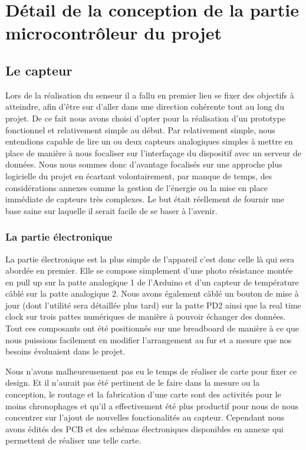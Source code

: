 \section{Détail de la conception de la partie microcontrôleur du projet}
	\subsection{Le capteur}
		Lors de la réalisation du senseur il a fallu en premier lieu se fixer
		des objectifs à atteindre, afin d'être sur d'aller dans une direction
		cohérente tout au long du projet. De  ce fait nous avons choisi d'opter pour
		la réalisation d'un prototype fonctionnel et relativement simple au début.
		Par relativement simple, nous entendions capable de lire un ou deux capteurs
		analogiques simples à mettre en place de manière à nous focaliser sur
		l'interfaçage du dispositif avec un serveur de données. Nous nous sommes
		donc d'avantage focalisés sur une approche plus logicielle du projet en
		écartant volontairement, par manque de temps, des considérations annexes
		comme la gestion de l'énergie ou la mise en place immédiate de capteurs
		très complexes. Le but était réellement de fournir une base saine sur laquelle
		il serait facile de se baser à l'avenir.
		
		\subsubsection{La partie électronique}
		
		La partie électronique est la plus simple de l'appareil c'est donc celle
		là qui sera abordée en premier. Elle se compose simplement d'une photo résistance
		montée en pull up sur la patte analogique 1 de l'Arduino et d'un capteur de
		température câblé sur la patte analogique 2. Nous avons également câblé un bouton de
		mise à jour (dont l'utilité sera détaillée plus tard) sur la patte PD2
		ainsi que la real time clock sur trois pattes numériques de manière à pouvoir
		échanger des données. Tout ces composants ont été positionnés sur une breadboard
		de manière à ce que nous puissions facilement en modifier l'arrangement au fur et a mesure
		que nos besoins évoluaient dans le projet.
		\par
		Nous n'avons malheureusement pas eu le temps de réaliser de carte
		pour fixer ce design. Et il n'aurait pas été pertinent de le faire dans la mesure
		ou la conception, le routage et la fabrication d'une carte sont des activités pour
		le moins chronophages et qu'il a effectivement été plus productif pour nous de nous
		concentrer sur l'ajout de nouvelles fonctionalités au capteur. Cependant
		nous avons édités des PCB et des schémas électroniques disponibles en
		annexe qui permettent de réaliser une telle carte.
		
